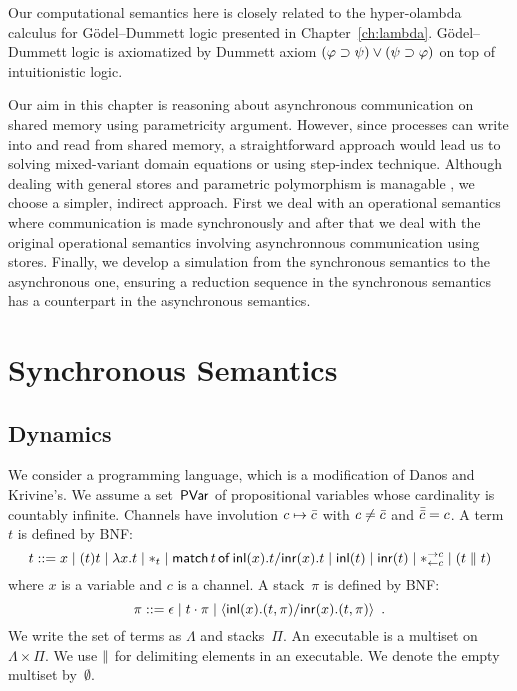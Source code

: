 Our computational semantics here is closely related to
the hyper-olambda calculus for G\"odel--Dummett logic presented in
Chapter~\ref{ch:lambda}.
G\"odel--Dummett logic is axiomatized by Dummett axiom $(\varphi\supset\psi)\lor(\psi\supset\varphi)$
on top of intuitionistic logic.  

Our aim in this chapter is reasoning about asynchronous communication on
shared memory using parametricity argument.
However, since processes can write into and read from shared memory,
a straightforward approach would lead us to solving mixed-variant domain
equations or using step-index technique.
Although dealing with general stores and parametric
polymorphism is managable ,
we choose a simpler, indirect approach.
First we deal with an operational semantics where communication is made
synchronously and after that we deal with the original operational
semantics involving asynchronnous communication using stores.
Finally, we develop a simulation from the synchronous semantics to the
asynchronous one, ensuring a reduction sequence in the synchronous
semantics has a counterpart in the asynchronous semantics.

\section{Synchronous Semantics}
\label{sec:sync}

\subsection{Dynamics}
We consider a programming language, which is a modification of
Danos and Krivine's.
We assume a set~$\mathsf{PVar}$ of propositional variables whose cardinality is
countably infinite.
Channels have involution $c\mapsto\bar{c}$ with
$c\neq \bar{c}$ and
$\bar{\bar{c}} = c$.
A term~$t$ is defined by BNF:
\[
 t::= x
 \mid (t)t
 \mid \lambda x.t
 \mid \ast_t
 \mid \mathsf{match}\,{t}\,\mathsf{of}\, \mathsf{inl}({x}). {t}/ \mathsf{inr}({x}). {t}
 \mid \mathsf{inl}({t})
 \mid \mathsf{inr}({t})
 \mid \ast^{\rightarrow {c}}_{\leftarrow{c}}
 \mid (t\parallel t)
\]
where $x$ is a variable and $c$ is a channel.
A stack~$\pi$ is defined by BNF:
\[
 \pi ::= \epsilon
 \mid t\cdot \pi
 \mid \langle \mathsf{inl}({x}). ({t},{\pi})/ \mathsf{inr}({x}). ({t},{\pi})\rangle
 \enspace.
\]
We write the set of terms as $\Lambda$ and stacks~$\Pi$.
An executable is a multiset on $\Lambda\times\Pi$.
We use $\parallel$ for delimiting elements in an executable.
We denote the empty multiset by~$\emptyset$.

